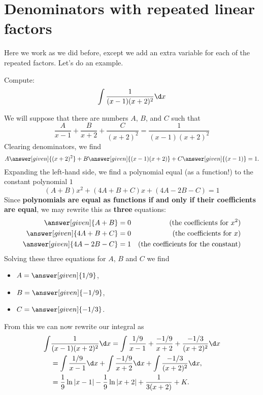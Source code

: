 \documentclass{ximera}
\begin{document}
\section{Denominators with repeated linear factors}

Here we work as we did before, except we add an extra variable for
each of the repeated factors. Let's do an example.

\begin{example}
  Compute:
  \[
  \int \frac{1}{(x-1)(x+2)^2} \d x
  \]
  \begin{explanation}
    We will suppose that there are numbers $A$, $B$, and $C$ such that
    \[
    \frac{A}{x-1} + \frac{B}{x+2} + \frac{C}{(x+2)^2} = \frac{1}{(x-1)(x+2)^2}
    \]
    Clearing denominators, we find
    \[
    A\answer[given]{(x+2)^2} + B\answer[given]{(x-1)(x+2)} + C\answer[given]{(x-1)} = 1.
    \]
    Expanding the left-hand side, we find a polynomial equal (as a
    function!) to the constant polynomial $1$
    \[
    (A+B)x^2 + (4A+B+C)x + (4A-2B-C) = 1
    \]
    Since \textbf{polynomials are equal as functions if and only if
      their coefficients are equal}, we may rewrite this as
    \textbf{three} equations:
    \begin{align*}
      \answer[given]{A+B} &= 0 &\text{(the coefficients for $x^2$)}\\
      \answer[given]{4A+B+C} &= 0 &\text{(the coefficients for $x$)}\\
      \answer[given]{4A-2B-C} &= 1 &\text{(the coefficients for the constant)}
    \end{align*}
    Solving these three equations for $A$, $B$ and $C$ we find
    \begin{itemize}
    \item $A = \answer[given]{1/9}$,
    \item $B = \answer[given]{-1/9}$,
    \item $C = \answer[given]{-1/3}$.
    \end{itemize}
    From this we can now rewrite our integral as
    \begin{align*}
      \int&\frac{1}{(x-1)(x+2)^2}\d x= \int \frac{1/9}{x-1}+ \frac{-1/9}{x+2} + \frac{-1/3}{(x+2)^2}\d x\\
      &= \int \frac{1/9}{x-1}\d x + \int \frac{-1/9}{x+2}\d x + \int \frac{-1/3}{(x+2)^2}\d x,\\
      &= \frac{1}{9}\ln|x-1| -\frac{1}{9}\ln|x+2| +\frac{1}{3(x+2)}+K.
    \end{align*}
  \end{explanation}
\end{example}
\end{document}

